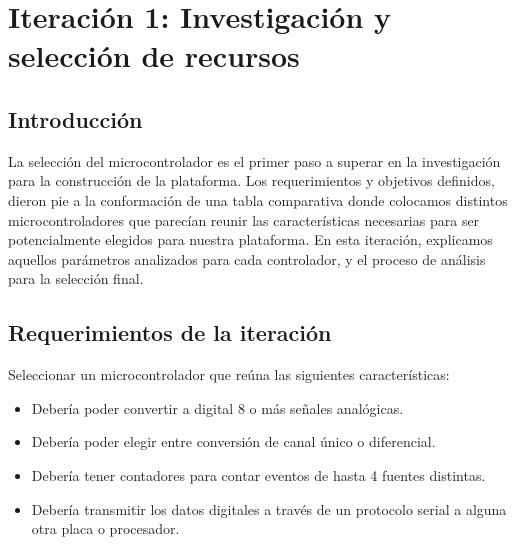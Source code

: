 \chapter{Iteración 1: Investigación y selección de recursos} %
\label{cha:iteracion_1}

\section{Introducción} %
\label{it1:sec:introduccion}

La selección del microcontrolador es el primer paso a superar en la investigación para la construcción de la plataforma. Los requerimientos y objetivos definidos, dieron pie a la conformación de una tabla comparativa donde colocamos distintos microcontroladores que parecían reunir las características necesarias para ser potencialmente elegidos para nuestra plataforma. En esta iteración, explicamos aquellos parámetros analizados para cada controlador, y el proceso de análisis para la selección final.




\section{Requerimientos de la iteración} %
\label{it1:sec:requerimientos_de_la_iteracion}

Seleccionar un microcontrolador que reúna las siguientes características:
\begin{itemize}
  \item Debería poder convertir a digital 8 o más señales analógicas.
  \item Debería poder elegir entre conversión de canal único o diferencial.
  \item Debería tener contadores para contar eventos de hasta 4 fuentes distintas.
  \item Debería transmitir los datos digitales a través de un protocolo serial a alguna otra placa o procesador.
\end{itemize}


